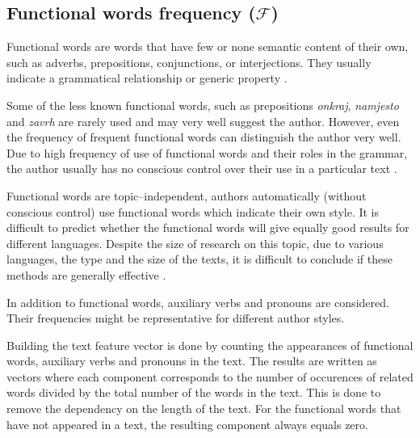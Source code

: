 \documentclass[11pt,english]{article}
\begin{document}
\begin{multicols}{2}


\subsection{Functional words frequency ($\mathcal{F}$)}
\label{sec:funkcijske-rijeci}
Functional words are words that have few or none semantic content of their
own, such as adverbs, prepositions, conjunctions, or interjections. They usually
indicate a grammatical relationship or generic property
\citep{zhao2005effective}.

Some of the less known functional words, such as prepositions \emph{onkraj},
\emph{namjesto} and \emph{zavrh} are rarely used and may very well suggest the
author. However, even the frequency of frequent functional words can distinguish the author very well. Due to high frequency of use of
functional words and their roles in the grammar, the author usually has no
conscious control over their use in a particular text
\citep{argamon2005measuring}.

Functional words are topic--independent, authors automatically (without conscious
control) use functional words which indicate their own style.
It is difficult to predict whether the functional words will give equally good
results for different languages. Despite the size of research on this
topic, due to various languages, the type and the size of the texts, it is
difficult to conclude if these methods are generally effective \citep{zhao2005effective}.

In addition to functional words, auxiliary verbs and pronouns are considered.
Their frequencies might be representative for different author styles.

Building the text feature vector is done by counting the appearances
of functional words, auxiliary verbs and pronouns in the text. The results
are written as vectors where each component corresponds to the number of occurences of
related words divided by the total number of the words in the text. This is done
to remove the dependency on the length of the text. For the functional words that
have not appeared in a text, the resulting component always equals zero.


\end{multicols}
\end{document}
